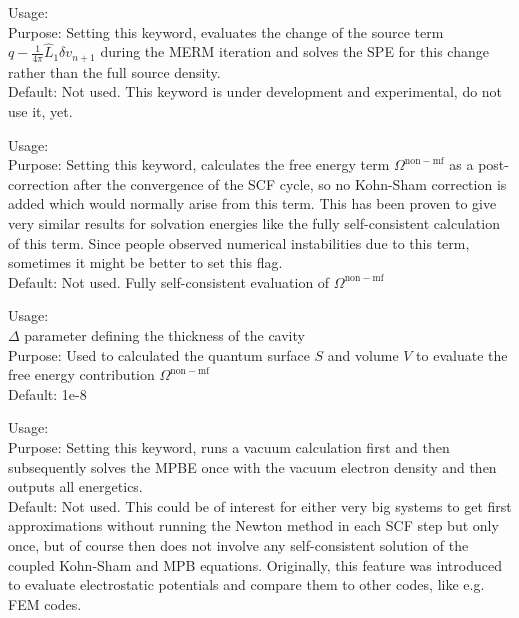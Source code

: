{
  \noindent
  Usage: \\[1.0ex]
  Purpose: Setting this keyword, evaluates the change of the source term ${q -\frac{1}{4\pi}\hat{L}_1 \delta v_{n+1}}$ during the MERM iteration and solves the SPE for this change rather than the full source density. \\[1.0ex]
  Default: Not used. This keyword is under development and experimental, do not use it, yet.
}

{
  \noindent
  Usage: \\[1.0ex]
  Purpose: Setting this keyword, calculates the free energy term $\Omega^\mathrm{non-mf}$ as a post-correction after the convergence of the SCF cycle, so no Kohn-Sham correction is added which would normally arise from this term. This has been proven to give very similar results for solvation energies like the fully self-consistent calculation of this term. Since people observed numerical instabilities due to this term, sometimes it might be better to set this flag.\\[1.0ex]
  Default: Not used. Fully self-consistent evaluation of $\Omega^\mathrm{non-mf}$
}

{
  \noindent
  Usage:  \\[1.0ex]
   $\Delta$ parameter defining the thickness of the cavity \\[1.0ex]
  Purpose: Used to calculated the quantum surface $S$ and volume $V$ to evaluate the free energy contribution $\Omega^\mathrm{non-mf}$\\[1.0ex]
  Default: 1e-8
}

{
  \noindent
  Usage: \\[1.0ex]
  Purpose: Setting this keyword, runs a vacuum calculation first and then subsequently solves the MPBE once with the vacuum electron density and then outputs all energetics.\\[1.0ex]
  Default: Not used. This could be of interest for either very big systems to get first approximations without running the Newton method in each SCF step but only once, but of course then does not involve any self-consistent solution of the coupled Kohn-Sham and MPB equations. Originally, this feature was introduced to evaluate electrostatic potentials and compare them to other codes, like e.g. FEM codes.
}



